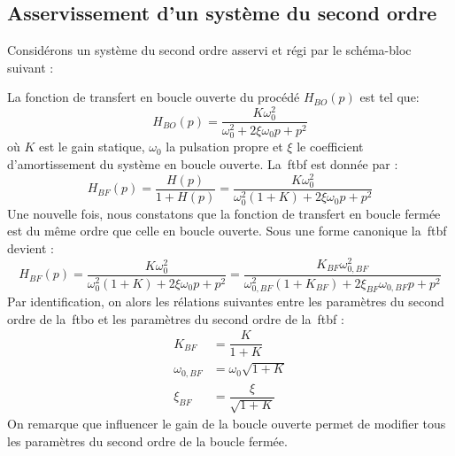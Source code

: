 \subsection{Asservissement d'un système du second ordre}
Considérons un système du second ordre asservi et régi par le schéma-bloc 
suivant :
\begin{center}
    
\end{center}
La fonction de transfert en boucle ouverte du procédé $H_{BO}(p)$ est tel que:
\[
H_{BO}(p)=\dfrac{K\omega^2_0}{\omega^2_0+2\xi\omega_0p+p^2}
\]
où $K$ est le gain statique, $\omega_0$ la pulsation propre et $\xi$ 
le coefficient d'amortissement du système en boucle ouverte.
La~\gls{ftbf} est donnée par :
\[
H_{BF}(p)=\dfrac{H(p)}{1+H(p)}=
\dfrac{K\omega^2_0}{\omega^2_0(1+K)+2\xi\omega_0p+p^2}
\]
Une nouvelle fois, nous constatons que la fonction de transfert en 
boucle fermée est du même ordre que celle en boucle ouverte. 
Sous une forme canonique la~\gls{ftbf} devient :
\[
H_{BF}(p)=\dfrac{K\omega^2_0}{\omega^2_0(1+K)+2\xi\omega_0p+p^2}=
\dfrac{K_{BF}\omega^2_{0,BF}}{\omega^2_{0,BF}(1+K_{BF})+
2\xi_{BF}\omega_{0,BF}p+p^2}
\]
Par identification, on alors les rélations suivantes entre 
les paramètres du second ordre de la~\gls{ftbo} et les paramètres du 
second ordre de la~\gls{ftbf} :
\begin{align*}
       K_{BF}&=\dfrac{K}{1+K}\\
    \omega_{0,BF}&=\omega_0\sqrt{1+K}\\
    \xi_{BF}&=\dfrac{\xi}{\sqrt{1+K}}
\end{align*}
On remarque que influencer le gain de la boucle ouverte permet de modifier
tous les paramètres du second ordre de la boucle fermée.

